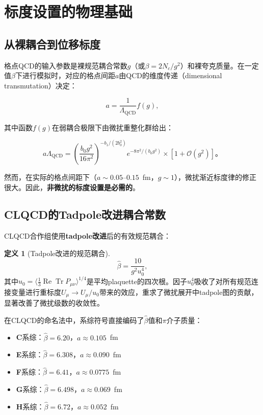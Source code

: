 \documentclass[12pt,a4paper]{ctexart}
\theoremstyle{definition}
\newtheorem{definition}{定义}[section]
\begin{document}
\section{标度设置的物理基础}

\subsection{从裸耦合到位移标度}

格点QCD的输入参数是裸规范耦合常数$g$（或$\beta = 2N_c/g^2$）和裸夸克质量。在一定值$\beta$下进行模拟时，对应的格点间距$a$由QCD的维度传递（dimensional transmutation）决定：

\begin{equation}
a = \frac{1}{\Lambda_{\text{QCD}}} f(g),
\label{eq:dim_transmutation}
\end{equation}

其中函数$f(g)$在弱耦合极限下由微扰重整化群给出：

\begin{equation}
a\Lambda_{\text{QCD}} = \left(\frac{b_0 g^2}{16\pi^2}\right)^{-b_1/(2b_0^2)} e^{-8\pi^2/(b_0 g^2)} \times [1 + \mathcal{O}(g^2)]。
\label{eq:asymptotic_scaling}
\end{equation}

然而，在实际的格点间距下（$a \sim 0.05\text{--}0.15$~fm，$g \sim 1$），微扰渐近标度律的修正很大。因此，\textbf{非微扰的标度设置是必需的}。

\subsection{CLQCD的Tadpole改进耦合常数}

CLQCD合作组\cite{CLQCD2025quark_mass,CLQCD2024charm}使用\textbf{tadpole改进}后的有效规范耦合：

\begin{definition}[Tadpole改进的规范耦合]
\begin{equation}
\boxed{\hat{\beta} = \frac{10}{g^2 u^4_0}},
\label{eq:tadpole_beta}
\end{equation}
其中$u_0 = \langle \frac{1}{3}\operatorname{Re}\operatorname{Tr} P_{\mu\nu} \rangle^{1/4}$是平均plaquette的四次根。因子$u^4_0$吸收了对所有规范连接变量进行重标度$U_\mu \to U_\mu/u_0$带来的效应，重求了微扰展开中tadpole图的贡献，显著改善了微扰级数的收敛性。
\end{definition}

在CLQCD的命名法中，系综符号直接编码了$\hat{\beta}$值和$\pi$介子质量：
\begin{itemize}
    \item \textbf{C}系综：$\hat{\beta} = 6.20$，$a \approx 0.105$~fm
    \item \textbf{E}系综：$\hat{\beta} = 6.308$，$a \approx 0.090$~fm
    \item \textbf{F}系综：$\hat{\beta} = 6.41$，$a \approx 0.0775$~fm
    \item \textbf{G}系综：$\hat{\beta} = 6.498$，$a \approx 0.069$~fm
    \item \textbf{H}系综：$\hat{\beta} = 6.72$，$a \approx 0.052$~fm
\end{itemize}
\end{document}
